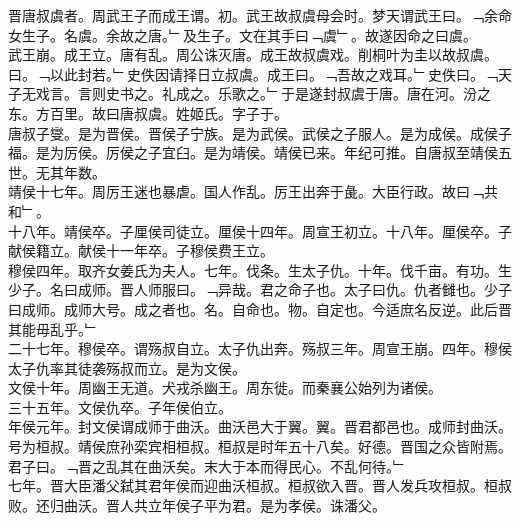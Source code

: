 \documentclass{zhvt-classic}
\begin{document}

\hspace*{2em}晋唐叔虞者。周武王子而成王谓。初。武王故叔虞母会时。梦天谓武王曰。﹁余命女生子。名虞。余故之唐。﹂及生子。文在其手曰﹁虞﹂。故遂因命之曰虞。\\
\hspace*{2em}武王崩。成王立。唐有乱。周公诛灭唐。成王故叔虞戏。削桐叶为圭以故叔虞。曰。﹁以此封若。﹂史佚因请择日立叔虞。成王曰。﹁吾故之戏耳。﹂史佚曰。﹁天子无戏言。言则史书之。礼成之。乐歌之。﹂于是遂封叔虞于唐。唐在河。汾之东。方百里。故曰唐叔虞。姓姬氏。字子于。\\
\hspace*{2em}唐叔子燮。是为晋侯。晋侯子宁族。是为武侯。武侯之子服人。是为成侯。成侯子福。是为厉侯。厉侯之子宜臼。是为靖侯。靖侯已来。年纪可推。自唐叔至靖侯五世。无其年数。\\
\hspace*{2em}靖侯十七年。周厉王迷也暴虐。国人作乱。厉王出奔于彘。大臣行政。故曰﹁共和﹂。\\
\hspace*{2em}十八年。靖侯卒。子厘侯司徒立。厘侯十四年。周宣王初立。十八年。厘侯卒。子献侯籍立。献侯十一年卒。子穆侯费王立。\\
\hspace*{2em}穆侯四年。取齐女姜氏为夫人。七年。伐条。生太子仇。十年。伐千亩。有功。生少子。名曰成师。晋人师服曰。﹁异哉。君之命子也。太子曰仇。仇者雠也。少子曰成师。成师大号。成之者也。名。自命也。物。自定也。今适庶名反逆。此后晋其能毋乱乎。﹂\\
\hspace*{2em}二十七年。穆侯卒。谓殇叔自立。太子仇出奔。殇叔三年。周宣王崩。四年。穆侯太子仇率其徒袭殇叔而立。是为文侯。\\
\hspace*{2em}文侯十年。周幽王无道。犬戎杀幽王。周东徙。而秦襄公始列为诸侯。\\
\hspace*{2em}三十五年。文侯仇卒。子年侯伯立。\\
\hspace*{2em}年侯元年。封文侯谓成师于曲沃。曲沃邑大于翼。翼。晋君都邑也。成师封曲沃。号为桓叔。靖侯庶孙栾宾相桓叔。桓叔是时年五十八矣。好德。晋国之众皆附焉。君子曰。﹁晋之乱其在曲沃矣。末大于本而得民心。不乱何待。﹂\\
\hspace*{2em}七年。晋大臣潘父弑其君年侯而迎曲沃桓叔。桓叔欲入晋。晋人发兵攻桓叔。桓叔败。还归曲沃。晋人共立年侯子平为君。是为孝侯。诛潘父。\\
\end{document}
